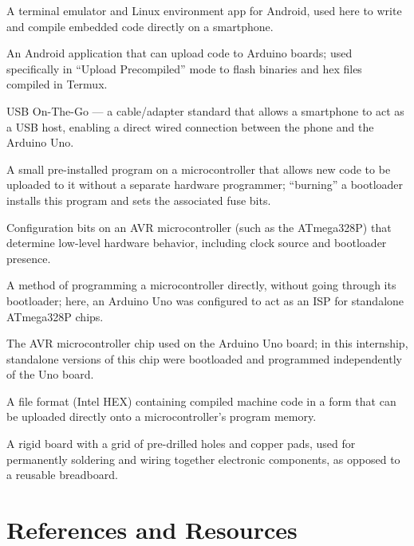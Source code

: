 \documentclass[12pt,a4paper]{report}
\begin{document}
\begin{description}[style=nextline,leftmargin=3.5cm,font=\bfseries]
    \item[Termux] A terminal emulator and Linux environment app for Android, used here to write and compile embedded code directly on a smartphone.
    \item[ArduinoDroid] An Android application that can upload code to Arduino boards; used specifically in ``Upload Precompiled'' mode to flash binaries and hex files compiled in Termux.
    \item[USB OTG] USB On-The-Go --- a cable/adapter standard that allows a smartphone to act as a USB host, enabling a direct wired connection between the phone and the Arduino Uno.
    \item[Bootloader] A small pre-installed program on a microcontroller that allows new code to be uploaded to it without a separate hardware programmer; ``burning'' a bootloader installs this program and sets the associated fuse bits.
    \item[Fuse Bits] Configuration bits on an AVR microcontroller (such as the ATmega328P) that determine low-level hardware behavior, including clock source and bootloader presence.
    \item[ISP (In-System Programmer)] A method of programming a microcontroller directly, without going through its bootloader; here, an Arduino Uno was configured to act as an ISP for standalone ATmega328P chips.
    \item[ATmega328P] The AVR microcontroller chip used on the Arduino Uno board; in this internship, standalone versions of this chip were bootloaded and programmed independently of the Uno board.
    \item[Hex File] A file format (Intel HEX) containing compiled machine code in a form that can be uploaded directly onto a microcontroller's program memory.
    \item[Perfboard] A rigid board with a grid of pre-drilled holes and copper pads, used for permanently soldering and wiring together electronic components, as opposed to a reusable breadboard.
\end{description}

\chapter{References and Resources}
\label{app:refs}
\end{document}
